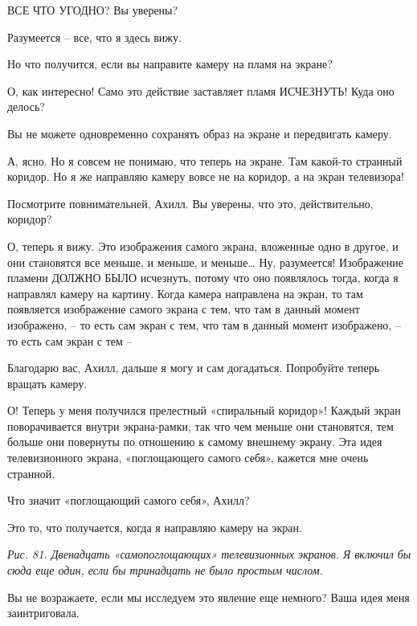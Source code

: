 \documentclass[../main.tex]{subfiles}
\begin{document}
\begin{dialogue}
 ВСЕ ЧТО УГОДНО? Вы уверены?

 Разумеется \--- все, что я здесь вижу.

 Но что получится, если вы направите камеру на пламя на экране?


 О, как интересно! Само это действие заставляет пламя ИСЧЕЗНУТЬ! Куда оно делось?

 Вы не можете одновременно сохранять образ на экране и передвигать камеру.

 А, ясно. Но я совсем не понимаю, что теперь на экране. Там какой-то странный коридор. Но я же направляю камеру вовсе не на коридор, а на экран телевизора!

 Посмотрите повнимательней, Ахилл. Вы уверены, что это, действительно, коридор?

 О, теперь я вижу. Это изображения самого экрана, вложенные одно в другое, и они становятся все меньше, и меньше, и меньше\ldots{} Ну, разумеется! Изображение пламени ДОЛЖНО БЫЛО исчезнуть, потому что оно появлялось тогда, когда я направлял камеру на картину. Когда камера направлена на экран, то там появляется изображение самого экрана с тем, что там в данный момент изображено, \--- то есть сам экран с тем, что там в данный момент изображено, \--- то есть сам экран с тем \---

 Благодарю вас, Ахилл, дальше я могу и сам догадаться. Попробуйте теперь вращать камеру.

 О! Теперь у меня получился прелестный «спиральный коридор»! Каждый экран поворачивается внутри экрана-рамки, так что чем меньше они становятся, тем больше они повернуты по отношению к самому внешнему экрану. Эта идея телевизионного экрана, «поглощающего самого себя», кажется мне очень странной.

 Что значит «поглощающий самого себя», Ахилл?

 Это то, что получается, когда я направляю камеру на экран.

\emph{Рис. 81. Двенадцать «самопоглощающих» телевизионных экранов. Я включил бы сюда еще один, если бы тринадцать не было простым числом.}

 Вы не возражаете, если мы исследуем это явление еще немного? Ваша идея меня заинтриговала.


\end{dialogue}
\end{document}
